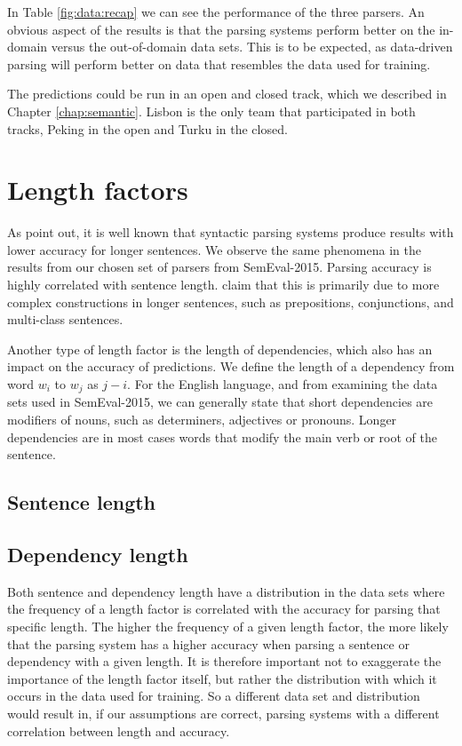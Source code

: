 In Table \ref{fig:data:recap} we can see the performance of the three parsers. An obvious aspect of the results is that the parsing systems perform better on the in-domain versus the out-of-domain data sets. This is to be expected, as data-driven parsing will perform better on data that resembles the data used for training.

The predictions could be run in an open and closed track, which we described in Chapter \ref{chap:semantic}. Lisbon is the only team that participated in both tracks, Peking in the open and Turku in the closed. 


\section{Length factors}

As  point out, it is well known that syntactic parsing systems produce results with lower accuracy for longer sentences. We observe the same phenomena in the results from our chosen set of parsers from SemEval-2015. Parsing accuracy is highly correlated with sentence length.  claim that this is primarily due to more complex constructions in longer sentences, such as prepositions, conjunctions, and multi-class sentences. 

Another type of length factor is the length of dependencies, which also has an impact on the accuracy of predictions. We define the length of a dependency from word $w_i$ to $w_j$ as $j - i$. For the English language, and from examining the data sets used in SemEval-2015, we can generally state that short dependencies are modifiers of nouns, such as determiners, adjectives or pronouns. Longer dependencies are in most cases words that modify the main verb or root of the sentence. 

\subsection{Sentence length}

\subsection{Dependency length}


Both sentence and dependency length have a distribution in the data sets where the frequency of a length factor is correlated with the accuracy for parsing that specific length. The higher the frequency of a given length factor, the more likely that the parsing system has a higher accuracy when parsing a sentence or dependency with a given length. It is therefore important not to exaggerate the importance of the length factor itself, but rather the distribution with which it occurs in the data used for training. So a different data set and distribution would result in, if our assumptions are correct, parsing systems with a different correlation between length and accuracy. 


